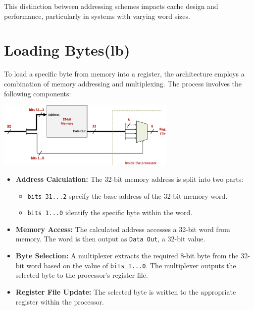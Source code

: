 This distinction between addressing schemes impacts cache design and performance, particularly in systems with varying word sizes.

\section{Loading Bytes(lb)}
To load a specific byte from memory into a register, the architecture employs a combination of memory addressing and multiplexing. The process involves the following components:

\begin{center}
    \includegraphics[width=0.65\textwidth]{chapters/chapter3a/images/lb.png}
\end{center}

\begin{itemize}
    \item \textbf{Address Calculation:} The 32-bit memory address is split into two parts:
    \begin{itemize}
        \item \texttt{bits 31...2} specify the base address of the 32-bit memory word.
        \item \texttt{bits 1...0} identify the specific byte within the word.
    \end{itemize}
    \item \textbf{Memory Access:} The calculated address accesses a 32-bit word from memory. The word is then output as \texttt{Data Out}, a 32-bit value.

    \item \textbf{Byte Selection:} A multiplexer extracts the required 8-bit byte from the 32-bit word based on the value of \texttt{bits 1...0}. The multiplexer outputs the selected byte to the processor's register file.

    \item \textbf{Register File Update:} The selected byte is written to the appropriate register within the processor.
\end{itemize}

